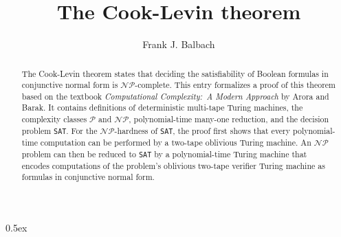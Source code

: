 \documentclass[10pt,a4paper]{report}
\newcommand{\NP}{\mathcal{NP}}
\newcommand{\SAT}{\texttt{SAT}}
\begin{document}
\title{The Cook-Levin theorem}
\author{Frank J. Balbach}
\maketitle

\begin{abstract}
The Cook-Levin theorem states that deciding the satisfiability of Boolean
formulas in conjunctive normal form is $\NP$-complete.  This entry
formalizes a proof of this theorem based on the textbook \emph{Computational
Complexity:\ A Modern Approach} by Arora and Barak.  It contains definitions
of deterministic multi-tape Turing machines, the complexity classes
$\mathcal{P}$ and $\NP$, polynomial-time many-one reduction, and the decision
problem \SAT.  For the $\NP$-hardness of \SAT, the proof first shows that every
polynomial-time computation can be performed by a two-tape oblivious Turing
machine. An $\NP$ problem can then be reduced to \SAT{} by a polynomial-time
Turing machine that encodes computations of the problem's oblivious two-tape
verifier Turing machine as formulas in conjunctive normal form.
\end{abstract}

\tableofcontents

\parindent 0pt\parskip 0.5ex





\end{document}
